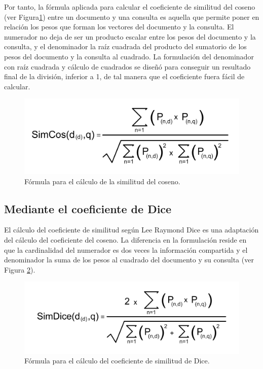 \documentclass{article}
\begin{document}
Por tanto, la fórmula aplicada para calcular el coeficiente de similitud del coseno (ver Figura\ref{fig: Figure 3}) entre un documento y una consulta es aquella que permite poner en relación los pesos que forman los vectores del documento y la consulta. El numerador no deja de ser un producto escalar entre los pesos del documento y la consulta, y el denominador la raíz cuadrada del producto del sumatorio de los pesos del documento y la consulta al cuadrado. La formulación del denominador con raíz cuadrada y cálculo de cuadrados se diseñó para conseguir un resultado final de la división, inferior a 1, de tal manera que el coeficiente fuera fácil de calcular.

\begin{figure}[h]
	\begin{center}
		\includegraphics*[scale=0.5]{similitud_coseno_formula.png}
	\end{center}
	\caption{Fórmula para el cálculo de la similitud del coseno.}
	\label{fig: Figure 3}
\end{figure}

\subsection{Mediante el coeficiente de Dice}

El cálculo del coeficiente de similitud según Lee Raymond Dice es una adaptación del cálculo del coeficiente del coseno. La diferencia en la formulación reside en que la cardinalidad del numerador es dos veces la información compartida y el denominador la suma de los pesos al cuadrado del documento y su consulta (ver Figura \ref{fig: Figure 4}). 

\begin{figure}[h]
	\begin{center}
		\includegraphics*[scale=0.5]{similitud_dice.png}
	\end{center}
	\caption{Fórmula para el cálculo del coeficiente de similitud de Dice.}
	\label{fig: Figure 4}
\end{figure}
\end{document}
